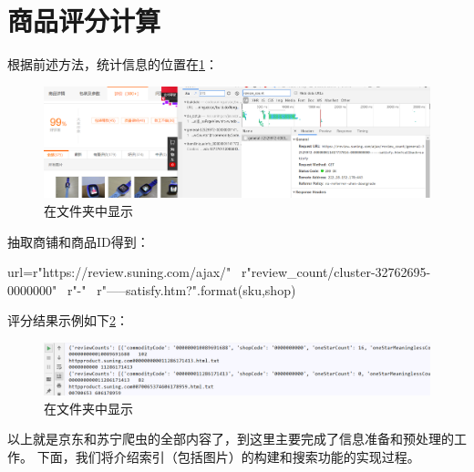 \section{商品评分计算}

根据前述方法，统计信息的位置在\ref{img:yhb121}：
\begin{figure}[htbp]
\centering
\includegraphics[width=13.5cm]{img/yhb/sn_eg.png}
\caption{在文件夹中显示}
\label{img:yhb121}   %
\end{figure}

抽取商铺和商品ID得到：
\begin{python}
url=r"https://review.suning.com/ajax/" \
        r"review_count/cluster-32762695-0000000" \
        r"{}-{}" \
        r"-----satisfy.htm?".format(sku,shop)
\end{python}
评分结果示例如下\ref{img:yhb101}：
\begin{figure}[htbp]
\centering
\includegraphics[width=13.5cm]{img/yhb/sn_res2.png}
\caption{在文件夹中显示}
\label{img:yhb101}   %
\end{figure}


以上就是京东和苏宁爬虫的全部内容了，到这里主要完成了信息准备和预处理的工作。
下面，我们将介绍索引（包括图片）的构建和搜索功能的实现过程。




